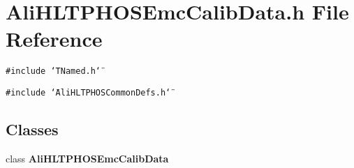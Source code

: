 \section{Ali\-HLTPHOSEmc\-Calib\-Data.h File Reference}
\label{AliHLTPHOSEmcCalibData_8h}
{\tt \#include \char`\"{}TNamed.h\char`\"{}}\par
{\tt \#include \char`\"{}Ali\-HLTPHOSCommon\-Defs.h\char`\"{}}\par
\subsection*{Classes}
\begin{CompactItemize}
\item 
class {\bf Ali\-HLTPHOSEmc\-Calib\-Data}
\end{CompactItemize}
